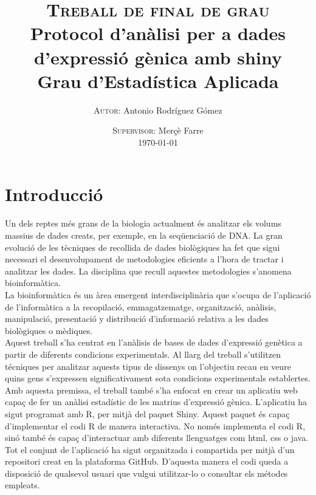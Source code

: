 \documentclass[english]{article}
\begin{document}
\title{
\textsc{Treball de final de grau}\\[2.6cm]
{\LARGE \bfseries Protocol d'anàlisi per a dades d'expressió gènica amb shiny}\\{\Large\bfseries Grau d'Estadística Aplicada}\\[5cm]
}

\author{
\textsc{Autor:} Antonio Rodríguez Gómez
}

\date{
\textsc{Supervisor:} Mer\c{c}è Farre \\[1em]
\today
}

\maketitle

\thispagestyle{empty}
\clearpage
\twocolumn[\makeAbstract]
\thispagestyle{empty}
\clearpage
\tableofcontents
\clearpage
\section{Introducció}
Un dels reptes més grans de la biologia actualment és analitzar els volums massius de dades creats, per exemple, en la seqüenciació de DNA. La gran evolució de les tècniques de recollida de dades biològiques ha fet que sigui necessari el desenvolupament de metodologies eficients a l'hora de tractar i analitzar les dades. La disciplina que recull aquestes metodologies s'anomena bioinformàtica.
\\

La bioinformàtica és un àrea emergent interdisciplinària que s'ocupa de l'aplicació de l'informàtica a la recopilació, emmagatzematge, organització, anàlisis, manipulació, presentació y distribució d'informació relativa a les dades biològiques o mèdiques.
\\

Aquest treball s'ha centrat en l'anàlisis de bases de dades d'expressió genètica a partir de diferents condicions experimentals. Al llarg del treball s'utilitzen técniques per analitzar aquests tipus de dissenys on l'objectiu recau en veure quins gens s'expressen significativament sota condicions experimentals establertes.
\\

Amb aquesta premissa, el treball també s'ha enfocat en crear un aplicatiu web capaç de fer un anàlisi estadístic de les matrius d'expressió gènica. L'aplicatiu ha sigut programat amb R, per mitjà del paquet Shiny. Aquest paquet és capa\c{c} d'implementar el codi R de manera interactiva. No només implementa el codi R, sinó també és capaç d'interactuar amb diferents llenguatges com html, css o java. Tot el conjunt de l'aplicació ha sigut organitzada i compartida per mitjà d'un repositori creat en la plataforma GitHub. D'aquesta manera el codi queda a disposició de qualsevol usuari que vulgui utilitzar-lo o consultar els métodes empleats.
\end{document}
